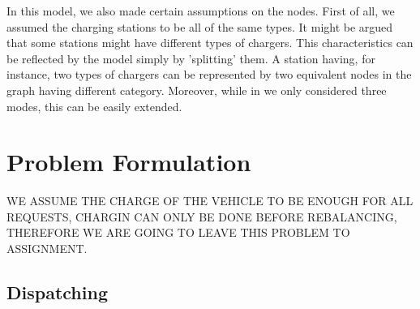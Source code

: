 In this model, we also made certain assumptions on the nodes. First of all, we assumed the charging stations to be all of the same types. It might be argued that some stations might have different types of chargers. This characteristics can be reflected by the model simply by 'splitting' them. A station having, for instance, two types of chargers can be represented by two equivalent nodes in the graph having different category. Moreover, while in  we only considered three modes, this can be easily extended. 


\section{Problem Formulation}
WE ASSUME THE CHARGE OF THE VEHICLE TO BE ENOUGH FOR ALL 
REQUESTS, CHARGIN CAN ONLY BE DONE BEFORE REBALANCING, 
THEREFORE WE ARE GOING TO LEAVE THIS PROBLEM TO ASSIGNMENT. 



\subsection{Dispatching}


